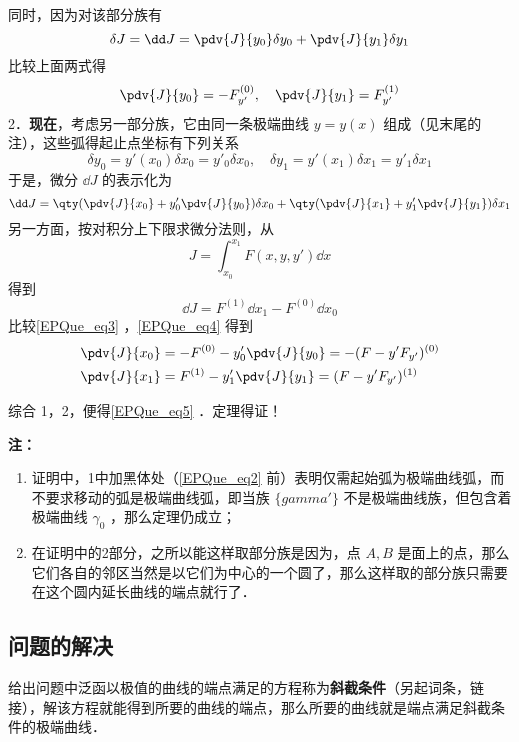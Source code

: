 同时，因为对该部分族有
\begin{equation}
\delta J=\dd J=\pdv{J}{y_0}\delta y_0+\pdv{J}{y_1}\delta y_1
\end{equation}
比较上面两式得
\begin{equation}
\pdv{J}{y_0}=-F_{y'}^{(0)},\quad \pdv{J}{y_1}=F_{y'}^{(1)}
\end{equation}
2．\textbf{现在}，考虑另一部分族，它由同一条极端曲线 $y=y(x)$ 组成（见末尾的注），这些弧得起止点坐标有下列关系
\begin{equation}
\delta y_0=y'(x_0)\delta x_0=y'_0\delta x_0,\quad \delta y_1=y'(x_1)\delta x_1=y'_1\delta x_1
\end{equation}
于是，微分 $\dd J$ 的表示化为
\begin{equation}\label{EPQue_eq3}
\dd J=\qty(\pdv{J}{x_0}+y'_0\pdv{J}{y_0})\delta x_0+\qty(\pdv{J}{x_1}+y'_1\pdv{J}{y_1})\delta x_1
\end{equation}
另一方面，按对积分上下限求微分法则，从
\begin{equation}
J=\int_{x_0}^{x_1}F(x,y,y')\dd x
\end{equation}
得到
\begin{equation}\label{EPQue_eq4}
\dd J=F^{(1)}\dd x_1-F^{(0)}\dd x_0
\end{equation}
比较\autoref{EPQue_eq3} ，\autoref{EPQue_eq4} 得到
\begin{equation}
\begin{aligned}
&\pdv{J}{x_0}=-F^{(0)}-y'_0\pdv{J}{y_0}=-(F-y'F_{y'})^{(0)}\\
&\pdv{J}{x_1}=F^{(1)}-y'_1\pdv{J}{y_1}=(F-y'F_{y'})^{(1)}
\end{aligned}
\end{equation}

综合 1，2，便得\autoref{EPQue_eq5} ．定理得证！

\textbf{注：}
\begin{enumerate}
\item 证明中，1中加黑体处（\autoref{EPQue_eq2} 前）表明仅需起始弧为极端曲线弧，而不要求移动的弧是极端曲线弧，即当族 $\{gamma'\}$ 不是极端曲线族，但包含着极端曲线 $\gamma_0$ ，那么定理仍成立；
\item 在证明中的2部分，之所以能这样取部分族是因为，点 $A,B$ 是面上的点，那么它们各自的邻区当然是以它们为中心的一个圆了，那么这样取的部分族只需要在这个圆内延长曲线的端点就行了．
\end{enumerate}
\subsection{问题的解决}
给出问题中泛函以极值的曲线的端点满足的方程称为\textbf{斜截条件}（另起词条，链接），解该方程就能得到所要的曲线的端点，那么所要的曲线就是端点满足斜截条件的极端曲线．